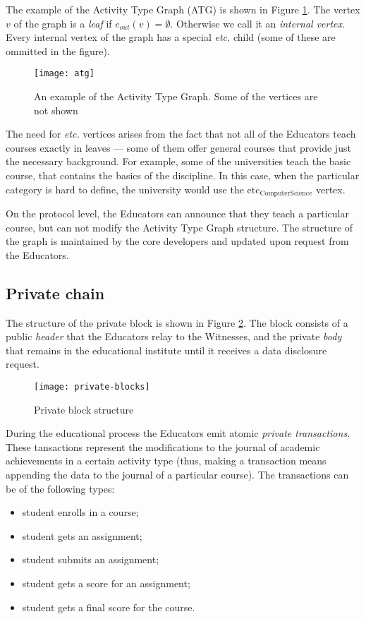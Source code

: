 The example of the Activity Type Graph (ATG) is shown in Figure \ref{fig:atg}. The vertex $v$ of the graph is a \textit{leaf} if $e_{out}(v) = \emptyset$. Otherwise we call it an \textit{internal vertex}. Every internal vertex of the graph has a special \textit{etc.} child (some of these are ommitted in the figure).

\begin{figure}[ht]
\centering
\texttt{[image: atg]}
\caption{An example of the Activity Type Graph. Some of the vertices are not shown}
\label{fig:atg}
\end{figure}

The need for \textit{etc.} vertices arises from the fact that not all of the Educators teach courses exactly in leaves — some of them offer general courses that provide just the necessary background. For example, some of the universities teach the basic  course, that contains the basics of the discipline. In this case, when the particular category is hard to define, the university would use the $\textrm{etc}_{\textrm{ComputerScience}}$ vertex.

On the protocol level, the Educators can announce that they teach a particular course, but can not modify the Activity Type Graph structure. The structure of the graph is maintained by the core developers and updated upon request from the Educators.

\subsection{Private chain}

The structure of the private block is shown in Figure \ref{fig:privateblocks}. The block consists of a public \textit{header} that the Educators relay to the Witnesses, and the private \textit{body} that remains in the educational institute until it receives a data disclosure request.

\begin{figure}[ht]
\centering
\texttt{[image: private-blocks]}
\caption{Private block structure}
\label{fig:privateblocks}
\end{figure}

During the educational process the Educators emit atomic \textit{private transactions}. These tansactions represent the modifications to the journal of academic achievements in a certain activity type (thus, making a transaction means appending the data to the journal of a particular course). The transactions can be of the following types:
\begin{itemize}
\item student enrolls in a course;
\item student gets an assignment;
\item student submits an assignment;
\item student gets a score for an assignment;
\item student gets a final score for the course.
\end{itemize}

